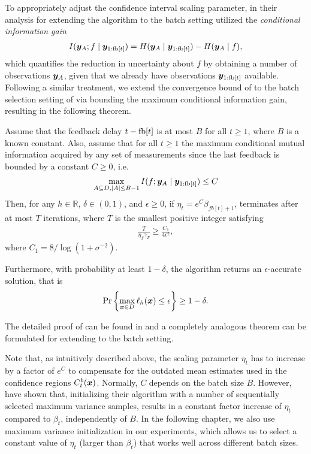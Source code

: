 To appropriately adjust the confidence interval scaling parameter,
in their analysis for extending the \gpucb algorithm to the batch
setting \citet{desautels12} utilized the
\emph{conditional information gain}
\begin{align*}
I(\bm{y}_A; f \mid \bm{y}_{1:\mathop{\mathrm{fb}}[t]}) = H(\bm{y}_A\mid\bm{y}_{1:\mathop{\mathrm{fb}}[t]}) - H(\bm{y}_A\mid f),
\end{align*}
which quantifies the reduction in uncertainty about $f$ by obtaining
a number of observations $\bm{y}_A$, given that we already have observations
$\bm{y}_{1:\mathop{\mathrm{fb}}[t]}$ available.
Following a similar treatment, we extend the convergence bound of
 to the batch selection setting of
\bacl via bounding the maximum conditional information gain, resulting
in the following theorem.

\begin{theorem}
\label{thm:bacl}
Assume that the feedback delay $t - \mathop{\mathrm{fb}}[t]$ is at most $B$ for all $t \geq 1$,
where $B$ is a known constant.
Also, assume that for all $t \geq 1$ the maximum conditional mutual information
acquired by any set of measurements since the last feedback is bounded
by a constant $C \geq 0$, i.e.
\begin{align*}
\max_{A\subseteq D, |A|\leq B-1} I(f; \bm{y}_A \mid \bm{y}_{1:\mathop{\mathrm{fb}}[t]}) \leq C
\end{align*}
Then, for any $h\in\mathbb{R}$, $\delta \in (0, 1)$, and $\epsilon \geq 0$,
if $\eta_t = e^C\beta_{fb[t]+1}$, \bacl terminates after
at most $T$ iterations, where $T$ is the smallest positive integer
satisfying
\begin{align*}
\frac{T}{\eta_T \gamma_T} \geq \frac{C_1}{4\epsilon^2},
\end{align*}
where $C_1 = 8/\log(1 + \sigma^{-2})$.

Furthermore, with probability at least $1-\delta$, the algorithm returns
an $\epsilon$-accurate solution, that is
\begin{align*}
\Pr\left\{\max_{\bm{x}\in D}\ell_h(\bm{x}) \leq \epsilon\right\} \geq 1 - \delta.
\end{align*}
\end{theorem}

The detailed proof of  can be found in
 and a completely analogous theorem can be
formulated for extending \iacl to the batch setting.

Note that, as intuitively described above, the scaling parameter
$\eta_t$ has to increase by a factor of $e^C$ to compensate for the outdated
mean estimates used in the confidence regions $C_t^b(\bm{x})$. Normally, $C$
depends on the batch size $B$. However, \citet{desautels12} have shown that,
initializing their \gpbucb algorithm with a number of sequentially selected
maximum variance samples, results in a constant factor increase of $\eta_t$
compared to $\beta_t$, independently of $B$.
In the following chapter, we also use maximum variance initialization in our
experiments, which allows us to select a constant value of $\eta_t$
(larger than $\beta_t$)
that works well across different batch sizes.

